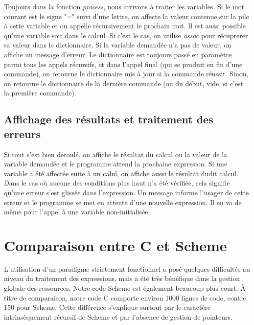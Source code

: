 \documentclass[letterpaper,12pt]{scrartcl}
\begin{document}
        Toujours dans la fonction \textit{process}, nous arrivons à traiter les variables. Si le mot courant est le signe "=" suivi d'une lettre, on affecte la valeur contenue sur la pile à cette variable et on appelle récursivement le prochain mot. Il est aussi possible qu'une variable soit dans le calcul. Si c'est le cas, on utilise \textit{assoc} pour récuprerer sa valeur dans le dictionnaire. Si la variable demandée n'a pas de valeur, on affiche un message d'erreur. Le dictionnaire est toujours passé en paramètre parmi tous les appels récursifs, et dans l'appel final (qui se produit en fin d'une commande), on retourne le dictionnaire mis à jour si la commande réussit. Sinon, on retourne le dictionnaire de la dernière commande (ou du début, vide, si c'est la première commande).
        
        
        \subsection{Affichage des résultats et traitement des erreurs}
        
        Si tout s'est bien déroulé, on affiche le résultat du calcul ou la valeur de la variable demandée et le programme attend la prochaine expression. Si une variable a été affectée suite à un calul, on affiche aussi le résultat dudit calcul. Dans le cas où aucune des conditions plus haut n'a été vérifiée, cela signifie qu'une erreur s'est glissée dans l'expression. Un message informe l'usager de cette erreur et le programme se met en attente d'une nouvelle expression. Il en va de même pour l'appel à une variable non-initialisée.
        
	
	
	\section{Comparaison entre C et Scheme}
	
	L'utilisation d'un paradigme strictement fonctionnel a posé quelques difficultés au niveau du traitement des expressions, mais a été très bénéfique dans la gestion globale des ressources. Notre code Scheme est également beaucoup plus court. À titre de comparaison, notre code C comporte environ 1000 lignes de code, contre 150 pour Scheme. Cette différence s'explique surtout par le caractère intrinsèquement récursif de Scheme et par l'absence de gestion de pointeurs.
	
	\vspace{0.5cm}
	
\end{document}
